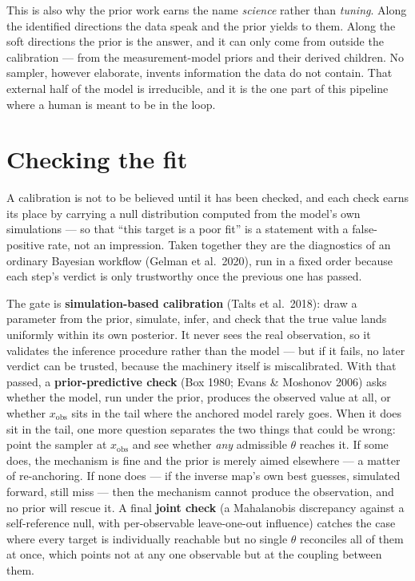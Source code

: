 \documentclass[11pt]{article}
\newcommand{\vocab}[1]{\textcolor{vocabc}{\textbf{#1}}}
\renewcommand{\th}{\theta}
\newcommand{\xobs}{x_{\mathrm{obs}}}
\begin{document}
This is also why the prior work earns the name \emph{science} rather than \emph{tuning}.
Along the identified directions the data speak and the prior yields to them. Along the
soft directions the prior is the answer, and it can only come from outside the
calibration --- from the measurement-model priors and their derived children. No sampler,
however elaborate, invents information the data do not contain. That external half of the
model is irreducible, and it is the one part of this pipeline where a human is meant to be
in the loop.

\section{Checking the fit}

A calibration is not to be believed until it has been checked, and each check earns its
place by carrying a null distribution computed from the model's own simulations --- so
that ``this target is a poor fit'' is a statement with a false-positive rate, not an
impression. Taken together they are the diagnostics of an ordinary Bayesian workflow
(Gelman et al.\ 2020), run in a fixed order because each step's verdict is only
trustworthy once the previous one has passed.

The gate is \vocab{simulation-based calibration} (Talts et al.\ 2018): draw a parameter
from the prior, simulate, infer, and check that the true value lands uniformly within its
own posterior. It never sees the real observation, so it validates the inference
procedure rather than the model --- but if it fails, no later verdict can be trusted,
because the machinery itself is miscalibrated. With that passed, a \vocab{prior-predictive
check} (Box 1980; Evans \& Moshonov 2006) asks whether the model, run under the prior,
produces the observed value at all, or whether $\xobs$ sits in the tail where the anchored
model rarely goes. When it does sit in the tail, one more question separates the two
things that could be wrong: point the sampler at $\xobs$ and see whether \emph{any}
admissible $\th$ reaches it. If some does, the mechanism is fine and the prior is merely
aimed elsewhere --- a matter of re-anchoring. If none does --- if the inverse map's own
best guesses, simulated forward, still miss --- then the mechanism cannot produce the
observation, and no prior will rescue it. A final \vocab{joint check} (a Mahalanobis
discrepancy against a self-reference null, with per-observable leave-one-out influence)
catches the case where every target is individually reachable but no single $\th$
reconciles all of them at once, which points not at any one observable but at the coupling
between them.
\end{document}

